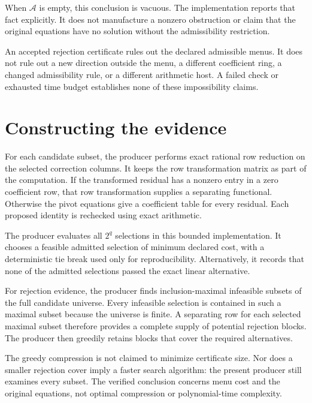 When $\mathcal A$ is empty, this conclusion is vacuous. The implementation reports that fact explicitly. It does not manufacture a nonzero obstruction or claim that the original equations have no solution without the admissibility restriction.

\begin{scopebox}[title=The scope of rejection]
An accepted rejection certificate rules out the declared admissible menus. It does not rule out a new direction outside the menu, a different coefficient ring, a changed admissibility rule, or a different arithmetic host. A failed check or exhausted time budget establishes none of these impossibility claims.
\end{scopebox}

\section{Constructing the evidence}

For each candidate subset, the producer performs exact rational row reduction on the selected correction columns. It keeps the row transformation matrix as part of the computation. If the transformed residual has a nonzero entry in a zero coefficient row, that row transformation supplies a separating functional. Otherwise the pivot equations give a coefficient table for every residual. Each proposed identity is rechecked using exact arithmetic.

The producer evaluates all $2^q$ selections in this bounded implementation. It chooses a feasible admitted selection of minimum declared cost, with a deterministic tie break used only for reproducibility. Alternatively, it records that none of the admitted selections passed the exact linear alternative.

For rejection evidence, the producer finds inclusion-maximal infeasible subsets of the full candidate universe. Every infeasible selection is contained in such a maximal subset because the universe is finite. A separating row for each selected maximal subset therefore provides a complete supply of potential rejection blocks. The producer then greedily retains blocks that cover the required alternatives.

The greedy compression is not claimed to minimize certificate size. Nor does a smaller rejection cover imply a faster search algorithm: the present producer still examines every subset. The verified conclusion concerns menu cost and the original equations, not optimal compression or polynomial-time complexity.

